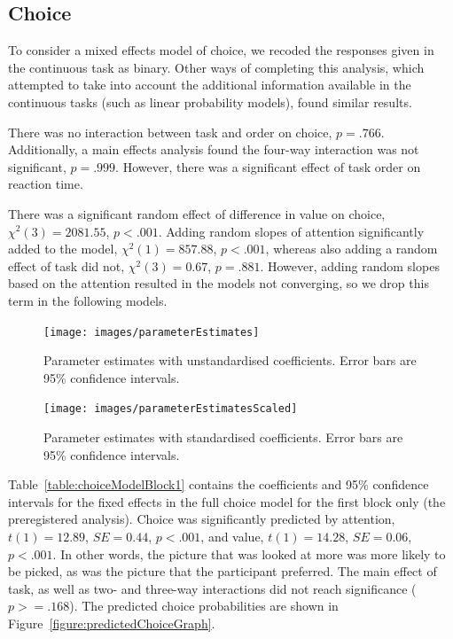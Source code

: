 \documentclass[12pt]{article}
\begin{document}
\subsection{Choice}
To consider a mixed effects model of choice, we recoded the responses given in the continuous task as binary. Other ways of completing this analysis, which attempted to take into account the additional information available in the continuous tasks (such as linear probability models), found similar results. 

There was no interaction between task and order on choice, $p=.766$. Additionally, a main effects analysis found the four-way interaction was not significant, $p=.999$. However, there was a significant effect of task order on reaction time.

There was a significant random effect of difference in value on choice, $\chi^2(3)=2081.55$, $p<.001$. Adding random slopes of attention significantly added to the model, $\chi^2(1)=857.88$, $p<.001$, whereas also adding a random effect of task did not, $\chi^2(3)=0.67$, $p=.881$. However, adding random slopes based on the attention resulted in the models not converging, so we drop this term in the following models. 





\begin{figure}
	\texttt{[image: images/parameterEstimates]}
	\caption{Parameter estimates with unstandardised coefficients. Error bars are 95\% confidence intervals.}	
\end{figure}

\begin{figure}
	\texttt{[image: images/parameterEstimatesScaled]}
	\caption{Parameter estimates with standardised coefficients. Error bars are 95\% confidence intervals.}	
\end{figure}


Table~\ref{table:choiceModelBlock1} contains the coefficients and 95\% confidence intervals for the fixed effects in the full choice model for the first block only (the preregistered analysis). Choice was significantly predicted by attention, $t(1)=12.89$, $SE=0.44$, $p<.001$, and value, $t(1)=14.28$, $SE=0.06$, $p<.001$. In other words, the picture that was looked at more was more likely to be picked, as was the picture that the participant preferred. The main effect of task, as well as two- and three-way interactions did not reach significance ($p>=.168$). The predicted choice probabilities are shown in Figure~\ref{figure:predictedChoiceGraph}.
\end{document}
